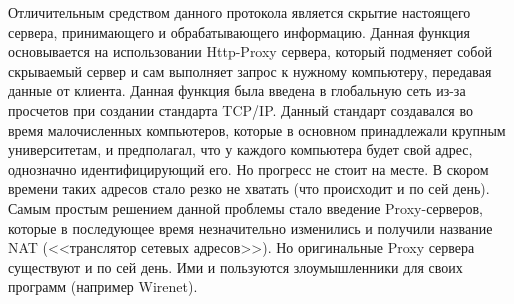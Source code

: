Отличительным средством данного протокола является скрытие настоящего сервера, принимающего и обрабатывающего информацию. Данная функция основывается на использовании Http-Proxy сервера, который подменяет собой скрываемый сервер и сам выполняет запрос к нужному компьютеру, передавая данные от клиента. Данная функция была введена в глобальную сеть из-за просчетов при создании стандарта TCP/IP. Данный стандарт создавался во время малочисленных компьютеров, которые в основном принадлежали крупным университетам, и предполагал, что у каждого компьютера будет свой адрес, однозначно идентифицирующий его. Но прогресс не стоит на месте. В скором времени таких адресов стало резко не хватать (что происходит и по сей день). Самым простым решением данной проблемы стало введение Proxy-серверов, которые в последующее время незначительно изменились и получили название NAT (<<транслятор сетевых адресов>>). Но оригинальные Proxy сервера существуют и по сей день. Ими и пользуются злоумышленники для своих программ (например Wirenet).